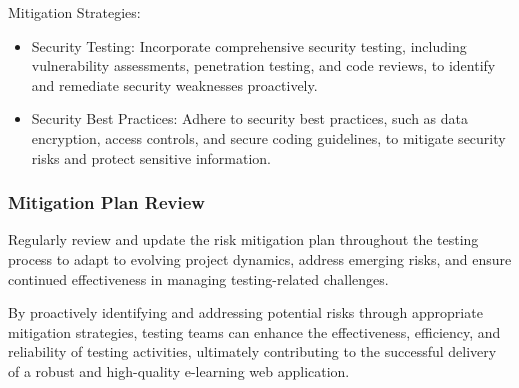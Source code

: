 		Mitigation Strategies:
		
		\begin{itemize}
			\item Security Testing: Incorporate comprehensive security testing, including vulnerability assessments, penetration testing, and code reviews, to identify and remediate security weaknesses proactively.
			\item Security Best Practices: Adhere to security best practices, such as data encryption, access controls, and secure coding guidelines, to mitigate security risks and protect sensitive information.
		\end{itemize}
		
		\subsubsection{Mitigation Plan Review}
		
		Regularly review and update the risk mitigation plan throughout the testing process to adapt to evolving project dynamics, address emerging risks, and ensure continued effectiveness in managing testing-related challenges.
		
		By proactively identifying and addressing potential risks through appropriate mitigation strategies, testing teams can enhance the effectiveness, efficiency, and reliability of testing activities, ultimately contributing to the successful delivery of a robust and high-quality e-learning web application.
		
		
		
		
		
		
		
		
		
		
		
		
		
		
		
		
		
		
		
		
		
		
		
		
		